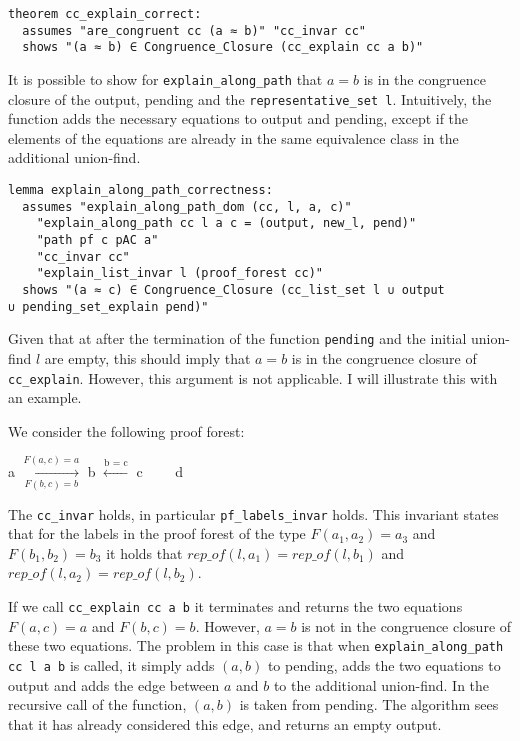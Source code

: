 \begin{lstlisting}
theorem cc_explain_correct:
  assumes "are_congruent cc (a ≈ b)" "cc_invar cc"
  shows "(a ≈ b) ∈ Congruence_Closure (cc_explain cc a b)"
\end{lstlisting}

It is possible to show for \lstinline{explain_along_path} that $a = b$ is in the congruence closure of the output, pending and the \lstinline{representative_set l}. Intuitively, the function adds the necessary equations to output and pending, except if the elements of the equations are already in the same equivalence class in the additional union-find.

\begin{lstlisting}
lemma explain_along_path_correctness:
  assumes "explain_along_path_dom (cc, l, a, c)"
    "explain_along_path cc l a c = (output, new_l, pend)"
    "path pf c pAC a"
    "cc_invar cc"
    "explain_list_invar l (proof_forest cc)"
  shows "(a ≈ c) ∈ Congruence_Closure (cc_list_set l ∪ output
∪ pending_set_explain pend)"
\end{lstlisting}

Given that at after the termination of the function \lstinline{pending} and the initial union-find $l$ are empty, this should imply that $a = b$ is in the congruence closure of \lstinline{cc_explain}.
However, this argument is not applicable. I will illustrate this with an example.

\begin{exmp}
We consider the following proof forest:

a $\xrightarrow[F(b,c) = b]{F(a,c) = a}$ b $\xleftarrow{\text{b = c}}$ c \ \ \ \ d

The \lstinline{cc_invar} holds, in particular \lstinline{pf_labels_invar} holds. This invariant states that for the labels in the proof forest of the type $F(a_1, a_2) = a_3$ and $F(b_1, b_2) = b_3$ it holds that $rep\_of(l, a_1) = rep\_of(l, b_1)$ and $rep\_of(l, a_2) = rep\_of(l, b_2)$.

If we call \lstinline{cc_explain cc a b} it terminates and returns the two equations $F(a,c) = a$ and $F(b,c) = b$.
However, $a = b$ is not in the congruence closure of these two equations.
The problem in this case is that when \lstinline{explain_along_path cc l a b} is called, it simply adds $(a, b)$ to pending, adds the two equations to output and adds the edge between $a$ and $b$ to the additional union-find.
In the recursive call of the function, $(a,b)$ is taken from pending.
The algorithm sees that it has already considered this edge, and returns an empty output.
\end{exmp}

